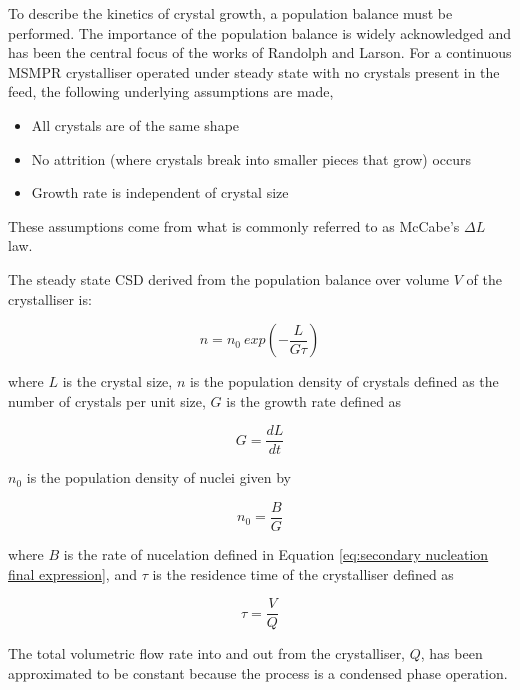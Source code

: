To describe the kinetics of crystal growth, a population balance must be performed. The importance of the population balance is widely acknowledged and has been the central focus of the works of Randolph and Larson. \cite{richardson_chemical_2006} \cite{randolph_theory_1971} For a continuous MSMPR crystalliser operated under steady state with no crystals present in the feed, the following underlying assumptions are made,

\begin{itemize}
    \item All crystals are of the same shape
    \item No attrition (where crystals break into smaller pieces that grow) occurs
    \item Growth rate is independent of crystal size
\end{itemize}

\noindent These assumptions come from what is commonly referred to as McCabe's $\Delta L$ law. 

The steady state CSD derived from the population balance over volume $V$ of the crystalliser is:

\begin{equation}
    n = n_0 ~exp(-\frac{L}{G\tau})
\end{equation}

\noindent where $L$ is the crystal size, $n$ is the population density of crystals defined as the number of crystals per unit size, $G$ is the growth rate defined as 

\begin{equation}
    G = \frac{dL}{dt}
\end{equation}

\noindent $n_0$ is the population density of nuclei given by 

\begin{equation}
    n_0 = \frac{B}{G}
\end{equation}

\noindent where $B$ is the rate of nucelation defined in Equation \ref{eq:secondary nucleation final expression}, and $\tau$ is the residence time of the crystalliser defined as 

\begin{equation}
    \tau = \frac{V}{Q}
\end{equation}

\noindent The total volumetric flow rate into and out from the crystalliser, $Q$, has been approximated to be constant because the process is a condensed phase operation. \cite{levenspiel_chemical_1999} 

